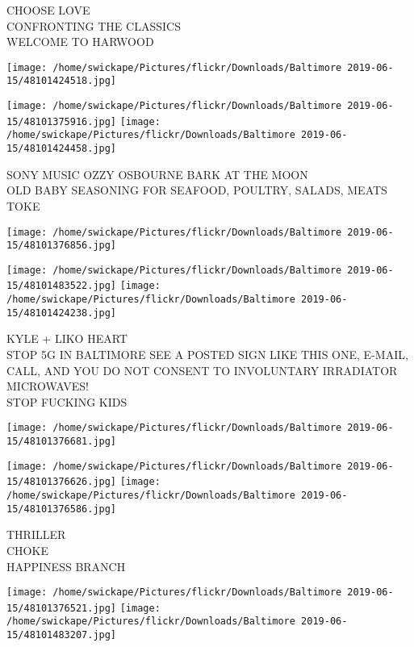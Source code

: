 \documentclass[10pt,letterpaper]{article}
\begin{document}
CHOOSE LOVE\\
CONFRONTING THE CLASSICS\\
WELCOME TO HARWOOD
\pagebreak

\texttt{[image: /home/swickape/Pictures/flickr/Downloads/Baltimore 2019-06-15/48101424518.jpg]}

\vspace{0.25in}
\texttt{[image: /home/swickape/Pictures/flickr/Downloads/Baltimore 2019-06-15/48101375916.jpg]}
\texttt{[image: /home/swickape/Pictures/flickr/Downloads/Baltimore 2019-06-15/48101424458.jpg]}

SONY MUSIC OZZY OSBOURNE BARK AT THE MOON\\
OLD BABY SEASONING FOR SEAFOOD, POULTRY, SALADS, MEATS\\
TOKE
\pagebreak

\texttt{[image: /home/swickape/Pictures/flickr/Downloads/Baltimore 2019-06-15/48101376856.jpg]}

\vspace{0.25in}
\texttt{[image: /home/swickape/Pictures/flickr/Downloads/Baltimore 2019-06-15/48101483522.jpg]}
\texttt{[image: /home/swickape/Pictures/flickr/Downloads/Baltimore 2019-06-15/48101424238.jpg]}

KYLE + LIKO HEART\\
STOP 5G IN BALTIMORE SEE A POSTED SIGN LIKE THIS ONE, E{-}MAIL, CALL, AND YOU DO NOT CONSENT TO INVOLUNTARY IRRADIATOR MICROWAVES!\\
STOP FUCKING KIDS
\pagebreak

\texttt{[image: /home/swickape/Pictures/flickr/Downloads/Baltimore 2019-06-15/48101376681.jpg]}

\vspace{0.25in}
\texttt{[image: /home/swickape/Pictures/flickr/Downloads/Baltimore 2019-06-15/48101376626.jpg]}
\texttt{[image: /home/swickape/Pictures/flickr/Downloads/Baltimore 2019-06-15/48101376586.jpg]}

THRILLER\\
CHOKE\\
HAPPINESS BRANCH
\pagebreak

\texttt{[image: /home/swickape/Pictures/flickr/Downloads/Baltimore 2019-06-15/48101376521.jpg]}
\texttt{[image: /home/swickape/Pictures/flickr/Downloads/Baltimore 2019-06-15/48101483207.jpg]}
\end{document}

